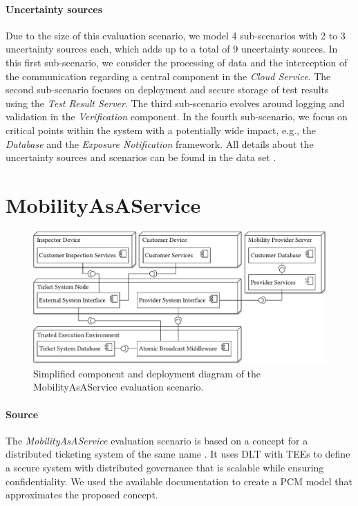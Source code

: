 \paragraph{Uncertainty sources}
Due to the size of this evaluation scenario, we model 4 sub-scenarios with 2 to 3 uncertainty sources each, which adds up to a total of 9 uncertainty sources.
In this first sub-scenario, we consider the processing of data and the interception of the communication regarding a central component in the \emph{Cloud Service}.
The second sub-scenario focuses on deployment and secure storage of test results using the \emph{Test Result Server}.
The third sub-scenario evolves around logging and validation in the \emph{Verification} component.
In the fourth sub-scenario, we focus on critical points within the system with a potentially wide impact, e.g., the \emph{Database} and the \emph{Exposure Notification} framework.
All details about the uncertainty sources and scenarios can be found in the data set \cite{dataset}.





\section{MobilityAsAService}%
\label{sec:evaluationscenarios:mobilityasaservice}

\begin{figure}
    \centering
    \includegraphics[width=\textwidth]{figures/chapter8/scenario5_mobilityasaservice.pdf}
    \caption{Simplified component and deployment diagram of the MobilityAsAService evaluation scenario.}
    \label{fig:evaluationscenarios:mobilityasaservice}
\end{figure}

\paragraph{Source}
The \emph{MobilityAsAService} evaluation scenario is based on a concept for a distributed ticketing system of the same name \cite{leinweber_leveraging_2023}.
It uses \acf{DLT} with \acfp{TEE} to define a secure system with distributed governance that is scalable while ensuring confidentiality.
We used the available documentation to create a \ac{PCM} model that approximates the proposed concept.

